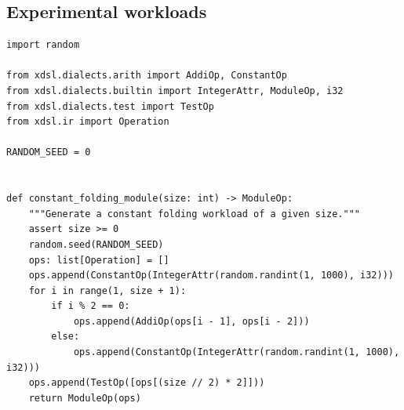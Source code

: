 \subsection{Experimental workloads}
\label{ssec:experimental-workloads}



\vspace{2em}

\begin{code}
    \begin{verbatim}
import random

from xdsl.dialects.arith import AddiOp, ConstantOp
from xdsl.dialects.builtin import IntegerAttr, ModuleOp, i32
from xdsl.dialects.test import TestOp
from xdsl.ir import Operation

RANDOM_SEED = 0


def constant_folding_module(size: int) -> ModuleOp:
    """Generate a constant folding workload of a given size."""
    assert size >= 0
    random.seed(RANDOM_SEED)
    ops: list[Operation] = []
    ops.append(ConstantOp(IntegerAttr(random.randint(1, 1000), i32)))
    for i in range(1, size + 1):
        if i % 2 == 0:
            ops.append(AddiOp(ops[i - 1], ops[i - 2]))
        else:
            ops.append(ConstantOp(IntegerAttr(random.randint(1, 1000), i32)))
    ops.append(TestOp([ops[(size // 2) * 2]]))
    return ModuleOp(ops)
    \end{verbatim}
    \caption{.}
    \label{listing:constant-folding-workload}
\end{code}

\vspace{2em}

